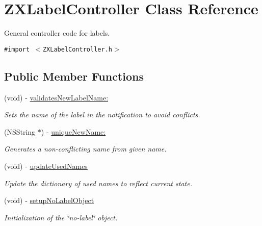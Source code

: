 \hypertarget{interface_z_x_label_controller}{
\section{ZXLabelController Class Reference}
\label{interface_z_x_label_controller}
}
General controller code for labels.  


{\tt \#import $<$ZXLabelController.h$>$}

\subsection*{Public Member Functions}
\begin{CompactItemize}
\item 
(void) - \hyperlink{interface_z_x_label_controller_50d77144c9045b2f125604b699d474fb}{validatesNewLabelName:}
\begin{CompactList}\small\item\em Sets the name of the label in the notification to avoid conflicts. \item\end{CompactList}\item 
(NSString $\ast$) - \hyperlink{interface_z_x_label_controller_e223bf8f8bc63f53f0790b34050fee97}{uniqueNewName:}
\begin{CompactList}\small\item\em Generates a non-conflicting name from given name. \item\end{CompactList}\item 
(void) - \hyperlink{interface_z_x_label_controller_f3fb09172b4b1ba2bc6ca4a0317ed201}{updateUsedNames}
\begin{CompactList}\small\item\em Update the dictionary of used names to reflect current state. \item\end{CompactList}\item 
\hypertarget{interface_z_x_label_controller_30de273ba04ff277ed54ad72762febbf}{
(void) - \hyperlink{interface_z_x_label_controller_30de273ba04ff277ed54ad72762febbf}{setupNoLabelObject}}
\label{interface_z_x_label_controller_30de273ba04ff277ed54ad72762febbf}

\begin{CompactList}\small\item\em Initialization of the \char`\"{}no-label\char`\"{} object. \item\end{CompactList}\end{CompactItemize}
